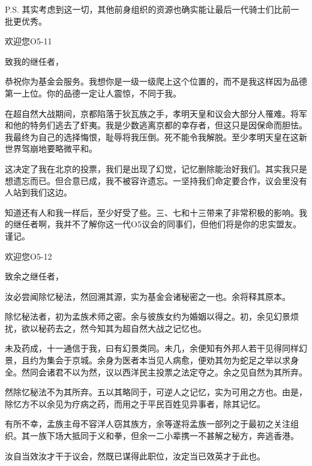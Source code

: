 \begin{whiteboxbb}
\begin{scpbox}
P.S. 其实考虑到这一切，其他前身组织的资源也确实能让最后一代骑士们比前一批更优秀。

\end{scpbox}

\begin{scpbox}

欢迎您O5-11

致我的继任者，

恭祝你为基金会服务。我想你是一级一级爬上这个位置的，而不是我这样因为品德第一上位。你的品德一定让人震惊，不同于我。

在超自然大战期间，京都陷落于狄瓦族之手，孝明天皇和议会大部分人罹难。将军和他的特务们逃去了虾夷。我是少数逃离京都的幸存者，但这只是因保命而胆怯。我最终为自己的选择悔恨，耻辱将我压倒。死不能令我解脱。至少孝明天皇在这新世界驾崩地要略微平和。

这决定了我在北京的投票，我们是出现了幻觉，记忆删除能治好我们。其实我只是想遗忘而已。但合意已成，我不被容许遗忘。一坚持我们命定要合作，议会里没有人站到我们这边。

知道还有人和我一样后，至少好受了些。三、七和十三带来了非常积极的影响。我的继任者啊，我并不了解你这一代O5议会的同事们，但他们将是你的忠实盟友。谨记。

\end{scpbox}

\begin{scpbox}

欢迎您O5-12

致余之继任者，

汝必尝闻除忆秘法，然回溯其源，实为基金会诸秘密之一也。余将释其原本。

除忆秘法者，初为孟族术师之密。余与彼族女约为婚姻以得之。初，余见幻景烦扰，欲以秘药去之，然今知其为超自然大战之记忆也。

未及药成，十一通信于我，曰有幻景类同。未几，余便知有外邦人若干见得同样幻景，且约为集会于京城。余身为医者本当见人病愈，便劝其勿为蛇足之举以求身全。然同会诸君不以为然，议以西洋民主投票之法定夺之。余之见自然为其所弃。

然除忆秘法不为其所弃。五以其略同于，可逆人之记忆，实为可用之方也。由是，除忆方不以余见为疗病之药，而用之于平民百姓见异事者，除其记忆。

有所不幸，孟族主母不容洋人窃其族方，余等遂将孟族一部列之于最初之关注组织。其一族下场大抵同于义和拳，但余一二小辈携一不甚解之秘方，奔逃香港。

汝自当效汝才干于议会，然既已谋得此职位，汝定当已效英才于此也。

\end{scpbox}


\end{whiteboxbb}
